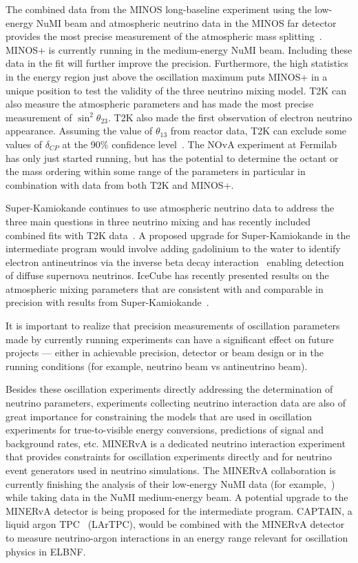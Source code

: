 The combined data from the MINOS long-baseline experiment using the
low-energy NuMI beam and atmospheric neutrino data in the MINOS far
detector provides the most precise measurement of the atmospheric mass
splitting~\cite{Adamson:2014vgd}.  MINOS+ is currently running in the
medium-energy NuMI beam.  Including these data in the fit will further
improve the precision.  Furthermore, the high statistics in the energy
region just above the oscillation maximum puts MINOS+ in a unique
position to test the validity of the three neutrino mixing model. T2K
can also measure the atmospheric parameters and has made the most
precise measurement of $\sin^2\theta_{23}$.  T2K also made the first
observation of electron neutrino appearance.  Assuming the value of
$\theta_{13}$ from reactor data, T2K can exclude some values of
$\delta_{CP}$ at the 90\% confidence level~\cite{Abe:2015awa}.  The
NOvA experiment at Fermilab has only just started running, but has the
potential to determine the octant or the mass ordering within some
range of the parameters in particular in combination with data from
both T2K and MINOS+.

Super-Kamiokande continues to use atmospheric neutrino data to address
the three main questions in three neutrino mixing and has recently
included combined fits with T2K data~\cite{Wendell:2014dka}.  A
proposed upgrade for Super-Kamiokande in the intermediate program would involve
adding gadolinium to the water to identify electron antineutrinos via
the inverse beta decay interaction~\cite{Beacom:2003nk} enabling
detection of diffuse supernova neutrinos. IceCube has recently
presented results on the atmospheric mixing parameters that are
consistent with and comparable in precision with results from
Super-Kamiokande~\cite{Aartsen:2014yll}.

It is important to realize that precision measurements of oscillation
parameters made by currently running experiments can have a
significant effect on future projects --- either in achievable
precision, detector or beam design or in the running conditions (for
example, neutrino beam vs antineutrino beam).

Besides these oscillation experiments directly addressing the
determination of neutrino parameters, experiments collecting neutrino
interaction data are also of great importance for constraining the models
that are used in oscillation experiments for true-to-visible energy
conversions, predictions of signal and background rates, etc.  MINERvA
is a dedicated neutrino interaction experiment that provides
constraints for oscillation experiments directly and for neutrino
event generators used in neutrino simulations.  The MINERvA
collaboration is currently finishing the analysis of their low-energy
NuMI data (for example,~\cite{Walton:2014esl}) while taking data in
the NuMI medium-energy beam.  A potential upgrade to the MINERvA
detector is being proposed for the intermediate program.  CAPTAIN, a
liquid argon TPC~\cite{Berns:2013usa} (LArTPC), would be combined with the
MINERvA detector to measure neutrino-argon interactions in an energy
range relevant for oscillation physics in ELBNF.

